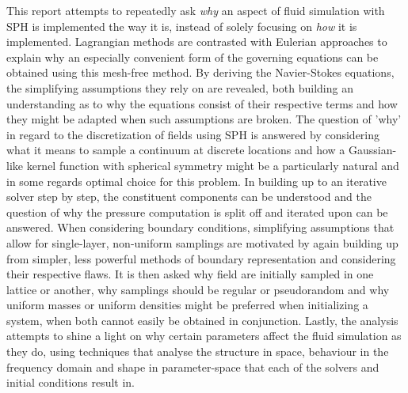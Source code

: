 This report attempts to repeatedly ask \textit{why} an aspect of fluid simulation with SPH is implemented the way it is, instead of solely focusing on \textit{how} it is implemented. Lagrangian methods are contrasted with Eulerian approaches to explain why an especially convenient form of the governing equations can be obtained using this mesh-free method. By deriving the Navier-Stokes equations, the simplifying assumptions they rely on are revealed, both building an understanding as to why the equations consist of their respective terms and how they might be adapted when such assumptions are broken. The question of 'why' in regard to the discretization of fields using SPH is answered by considering what it means to sample a continuum at discrete locations and how a Gaussian-like kernel function with spherical symmetry might be a particularly natural and in some regards optimal choice for this problem. In building up to an iterative solver step by step, the constituent components can be understood and the question of why the pressure computation is split off and iterated upon can be answered.
When considering boundary conditions, simplifying assumptions that allow for single-layer, non-uniform samplings are motivated by again building up from simpler, less powerful methods of boundary representation and considering their respective flaws. It is then asked why field are initially sampled in one lattice or another, why samplings should be regular or pseudorandom and why uniform masses or uniform densities might be preferred when initializing a system, when both cannot easily be obtained in conjunction. Lastly, the analysis attempts to shine a light on why certain parameters affect the fluid simulation as they do, using techniques that analyse the structure in space, behaviour in the frequency domain and shape in parameter-space that each of the solvers and initial conditions result in.